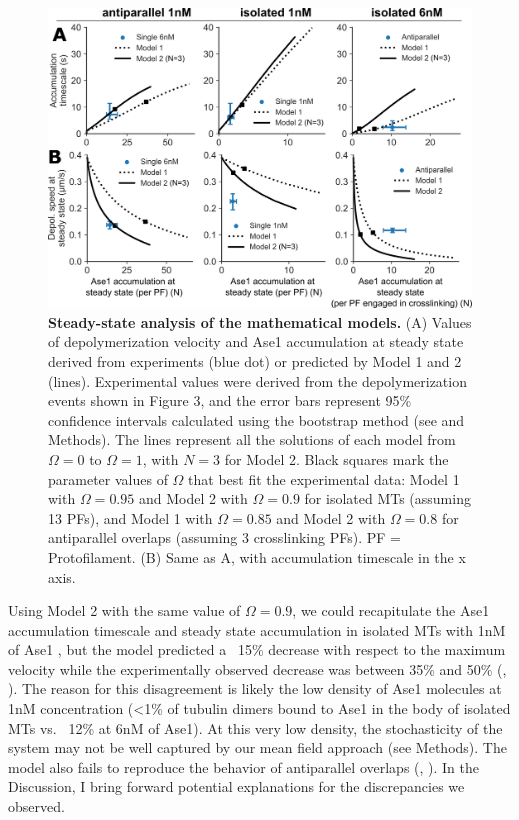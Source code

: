 \begin{figure}
    \centering
    \includegraphics[width=1\linewidth]{Figures/ase2steady.png}
    \caption[Steady-state analysis of the mathematical models.]{\textbf{Steady-state analysis of the mathematical models.}
        (A) Values of depolymerization velocity and Ase1 accumulation at steady state derived from experiments (blue dot) or predicted by Model 1 and 2 (lines). Experimental values were derived from the depolymerization events shown in Figure 3, and the error bars represent 95\% confidence intervals calculated using the bootstrap method (see  and Methods). The lines represent all the solutions of each model from $\Omega = 0$ to $\Omega = 1$, with $N = 3$ for Model 2. Black squares mark the parameter values of $\Omega$ that best fit the experimental data: Model 1 with $\Omega = 0.95$ and Model 2 with $\Omega = 0.9$ for isolated MTs (assuming 13 PFs), and Model 1 with $\Omega = 0.85$ and Model 2 with $\Omega = 0.8$ for antiparallel overlaps (assuming 3 crosslinking PFs). PF = Protofilament. (B) Same as A, with accumulation timescale in the x axis. 
    }\label{ase2steady}
\end{figure}

Using Model 2 with the same value of $\Omega=0.9$, we could recapitulate the Ase1 accumulation timescale and steady state accumulation in isolated MTs with 1nM of Ase1 , but the model predicted a ~15\% decrease with respect to the maximum velocity while the experimentally observed decrease was between 35\% and 50\% (, ). The reason for this disagreement is likely the low density of Ase1 molecules at 1nM concentration (<1\% of tubulin dimers bound to Ase1 in the body of isolated MTs vs. ~12\% at 6nM of Ase1). At this very low density, the stochasticity of the system may not be well captured by our mean field approach (see Methods). The model also fails to reproduce the behavior of antiparallel overlaps (, ). In the Discussion, I bring forward potential explanations for the discrepancies we observed. \clearpage


